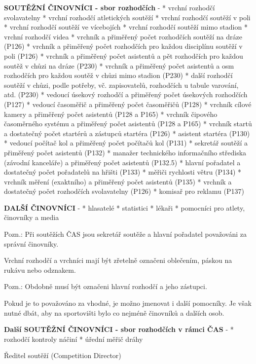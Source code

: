 {\bf SOUTĚŽNÍ ČINOVNÍCI - sbor rozhodčích}
\begitems \style -
* vrchní rozhodčí svolavatelny
* vrchní rozhodčí atletických soutěží
* vrchní rozhodčí soutěží v poli
* vrchní rozhodčí soutěží ve vícebojích
* vrchní rozhodčí soutěží mimo stadion
* vrchní rozhodčí videa
* vrchník a přiměřený počet rozhodčích soutěží na dráze (P126)
* vrchník a přiměřený počet rozhodčích pro každou disciplínu soutěží v poli (P126)
* vrchník a přiměřený počet asistentů a pět rozhodčích pro každou soutěž v chůzi na dráze (P230)
* vrchník a přiměřený počet asistentů a osm rozhodčích pro každou soutěž v chůzi mimo stadion (P230)
* další rozhodčí soutěží v chůzi, podle potřeby, vč. zapisovatelů, rozhodčích u tabule varování, atd. (P230)
* vedoucí úsekový rozhodčí a přiměřený počet úsekových rozhodčích (P127)
* vedoucí časoměřič a přiměřený počet časoměřičů (P128)
* vrchník cílové kamery a přiměřený počet asistentů (P128 a P165)
* vrchník čipového časoměrného systému a přiměřený počet asistentů (P128 a P165)
* vrchník startů a dostatečný počet startérů a zástupců startéra (P126)
* asistent startéra (P130)
* vedoucí počítač kol a přiměřený počet počítačů kol (P131)
* sekretář soutěží a přiměřený počet asistentů (P132)
* manažer technického informačního střediska (závodní kanceláře) a přiměřený počet asistentů (P132.5)
* hlavní pořadatel a dostatečný počet pořadatelů na hřišti (P133)
* měřiči rychlosti větru (P134)
* vrchník měření (exaktního) a přiměřený počet asistentů (P135)
* vrchník a dostatečný počet rozhodčích svolavatelny (P126)
* komisař pro reklamu (P137)
\enditems

{\bf DALŠÍ ČINOVNÍCI}
\begitems \style -
* hlasatelé
* statistici
* lékaři
* pomocníci pro atlety, činovníky a media
\enditems

Pozn.: Při soutěžích ČAS jsou sekretář soutěže a hlavní pořadatel považováni za správní činovníky.

Vrchní rozhodčí a vrchníci mají být zřetelně označeni oblečením, páskou na rukávu nebo odznakem.

Pozn.: Obdobně musí být označeni hlavní rozhodčí a jeho zástupci.

Pokud je to považováno za vhodné, je možno jmenovat i další pomocníky. Je však nutné dbát, aby na sportovišti bylo co nejméně činovníků a dalších osob.

{\bf Další SOUTĚŽNÍ ČINOVNÍCI - sbor rozhodčích v rámci ČAS}
\begitems \style -
* rozhodčí kontroly náčiní
* úřední měřič dráhy
\enditems

\secc Ředitel soutěží (Competition Director)

